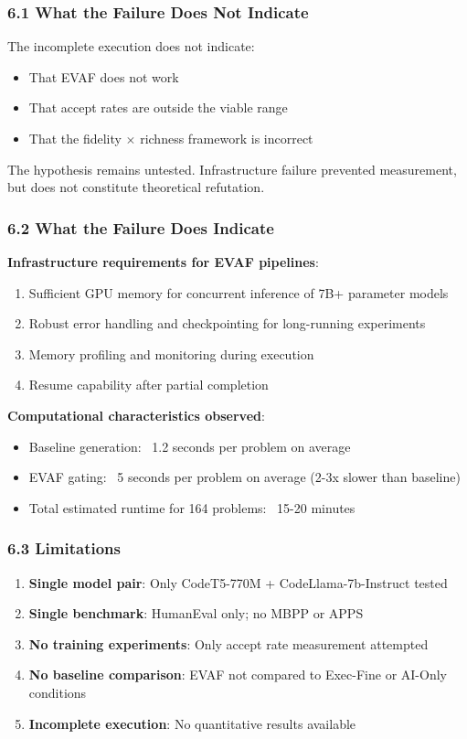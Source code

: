 
\subsubsection{6.1 What the Failure Does Not Indicate}

The incomplete execution does not indicate:
\begin{itemize}
\item That EVAF does not work
\item That accept rates are outside the viable range
\item That the fidelity $\times$ richness framework is incorrect
\end{itemize}

The hypothesis remains untested. Infrastructure failure prevented measurement, but does not constitute theoretical refutation.

\subsubsection{6.2 What the Failure Does Indicate}

\textbf{Infrastructure requirements for EVAF pipelines}:
\begin{enumerate}
\item Sufficient GPU memory for concurrent inference of 7B+ parameter models
\item Robust error handling and checkpointing for long-running experiments
\item Memory profiling and monitoring during execution
\item Resume capability after partial completion
\end{enumerate}

\textbf{Computational characteristics observed}:
\begin{itemize}
\item Baseline generation: ~1.2 seconds per problem on average
\item EVAF gating: ~5 seconds per problem on average (2-3x slower than baseline)
\item Total estimated runtime for 164 problems: ~15-20 minutes
\end{itemize}

\subsubsection{6.3 Limitations}

\begin{enumerate}
\item \textbf{Single model pair}: Only CodeT5-770M + CodeLlama-7b-Instruct tested
\item \textbf{Single benchmark}: HumanEval only; no MBPP or APPS
\item \textbf{No training experiments}: Only accept rate measurement attempted
\item \textbf{No baseline comparison}: EVAF not compared to Exec-Fine or AI-Only conditions
\item \textbf{Incomplete execution}: No quantitative results available
\end{enumerate}

